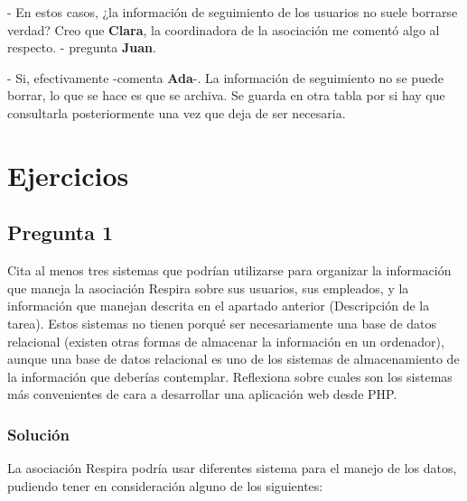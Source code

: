 - En estos casos, ¿la información de seguimiento de los usuarios no suele borrarse verdad? Creo que \textbf{Clara}, la coordinadora de la asociación me comentó algo al respecto. - pregunta \textbf{Juan}.

- Si, efectivamente -comenta \textbf{Ada}-. La información de seguimiento no se puede borrar, lo que se hace es que se archiva. Se guarda en otra tabla por si hay que consultarla posteriormente una vez que deja de ser necesaria.

\section{Ejercicios}

\subsection{Pregunta 1}
Cita al menos tres sistemas que podrían utilizarse para organizar la información que maneja la asociación Respira sobre sus usuarios, sus empleados, y la información que manejan descrita en el apartado anterior (Descripción de la tarea). Estos sistemas no tienen porqué ser necesariamente una base de datos relacional (existen otras formas de almacenar la información en un ordenador), aunque una base de datos relacional es uno de los sistemas de almacenamiento de la información que deberías contemplar. Reflexiona sobre cuales son los sistemas más convenientes de cara a desarrollar una aplicación web desde PHP.

\subsubsection{Solución}
La asociación Respira podría usar diferentes sistema para el manejo de los datos, pudiendo tener en consideración alguno de los siguientes:

